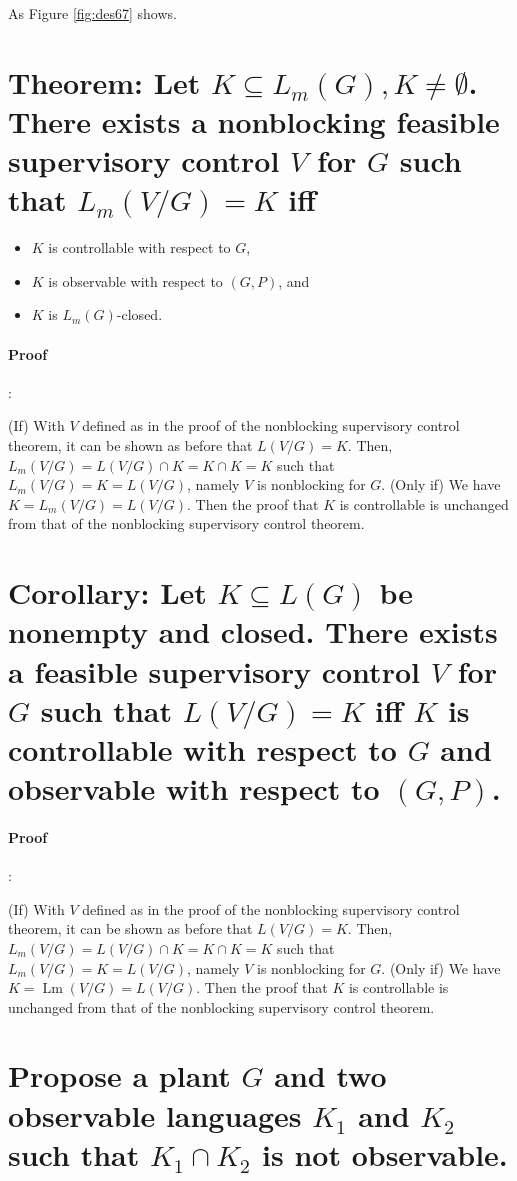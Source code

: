 \documentclass{article}
\begin{document}
As Figure \ref{fig:des67} shows.


\section{Theorem: Let $K \subseteq L_m(G), K \neq \emptyset$. There exists a nonblocking feasible supervisory control $V$ for $G$ such that $L_m(V / G)=K$ iff}
\begin{itemize}
  \item $K$ is controllable with respect to $G$,
  \item $K$ is observable with respect to $(G, P)$, and
  \item $K$ is $L_m(G)$-closed.
\end{itemize}

\paragraph{Proof}:

(If) With $V$ defined as in the proof of the nonblocking supervisory control theorem, it can be shown as before that $L(V / G)=K$. Then, $L_m(V / G)=L(V / G) \cap K=K \cap K=K$ such that $L_m(V / G)=K=L(V / G)$, namely $V$ is nonblocking for $G$. (Only if) We have $K=L_m(V / G)=L(V / G)$. Then the proof that $K$ is controllable is unchanged from that of the nonblocking supervisory control theorem.

\section{Corollary: Let $K \subseteq L(G)$ be nonempty and closed. There exists a feasible supervisory control $V$ for $G$ such that $L(V / G)=K$ iff $K$ is controllable with respect to $G$ and observable with respect to $(G, P)$.}


\paragraph{Proof}:

(If) With $V$ defined as in the proof of the nonblocking supervisory control theorem, it can be shown as before that $L(V / G)=K$. Then, $L_m(V / G)=L(V / G) \cap K=K \cap K=K$ such that $L_m(V / G)=K=L(V / G)$, namely $V$ is nonblocking for $G$.
(Only if) We have $K=\operatorname{Lm}(V / G)=L(V / G)$. Then the proof that $K$ is controllable is unchanged from that of the nonblocking supervisory control theorem.

\section{Propose a plant $G$  and two observable languages  $K_1$  and  $K_2$  such that  $K_1 \cap K_2$  is not observable. }
\end{document}

